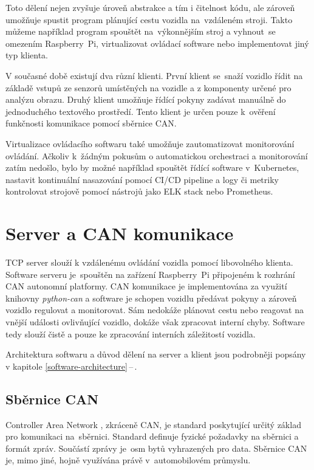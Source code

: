 \documentclass[czech, bachelor]{diploma}
\newcommand{\filipref}[1]{\ref{#1}\,--\,\nameref{#1}}
\begin{document}
Toto dělení nejen zvyšuje úroveň abstrakce a tím i čitelnost kódu, ale zároveň umožňuje spustit program plánující cestu vozidla
na~vzdáleném stroji. Takto můžeme například program spouštět na~výkonnějším stroj a vyhnout~se omezením Raspberry~Pi,
virtualizovat ovládací software nebo implementovat jiný typ klienta.

V současné době existují dva různí klienti. První klient se~snaží vozidlo řídit na základě vstupů ze senzorů umístěných na vozidle
a z komponenty určené pro analýzu obrazu. Druhý klient umožňuje řídící pokyny zadávat manuálně do jednoduchého textového
prostředí. Tento klient je určen pouze k~ověření funkčnosti komunikace pomocí sběrnice CAN.

Virtualizace ovládacího softwaru také umožňuje zautomatizovat monitorování ovládání. Ačkoliv k~žádným pokusům o automatickou
orchestraci a monitorování zatím nedošlo, bylo by možné například spouštět řídící software v~Kubernetes, nastavit kontinuální
nasazování pomocí CI/CD pipeline a logy či metriky kontrolovat strojově pomocí nástrojů jako ELK stack nebo Prometheus.

\chapter{Server a CAN komunikace}

TCP server slouží k vzdálenému ovládání vozidla pomocí libovolného klienta. Software serveru je~spouštěn na zařízení Raspberry~Pi
připojeném k rozhrání CAN autonomní platformy. CAN komunikace je implementována za využití knihovny \emph{python-can} a software
je schopen vozidlu předávat pokyny a zároveň vozidlo regulovat a monitorovat. Sám nedokáže plánovat cestu nebo reagovat
na vnější události ovlivňující vozidlo, dokáže však zpracovat interní chyby. Software tedy slouží čistě a pouze ke zpracování
interních záležitostí vozidla.

Architektura softwaru a důvod dělení na server a klient jsou podrobněji popsány v kapitole \filipref{software-architecture}.

\section{Sběrnice CAN}

Controller Area Network \cite{can-source}, zkráceně CAN, je standard poskytující určitý základ pro komunikaci na~sběrnici.
Standard definuje fyzické požadavky na sběrnici a formát zpráv. Součástí zprávy je~osm bytů vyhrazených pro data. Sběrnice CAN je,
mimo jiné, hojně využívána právě v~automobilovém průmyslu.
\end{document}
